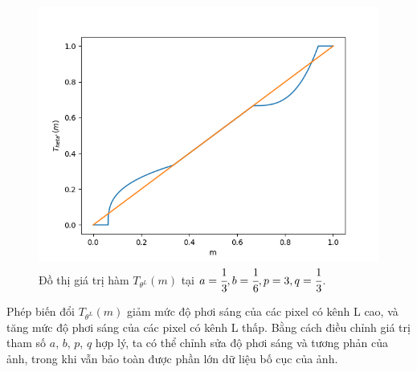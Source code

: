 \documentclass[12pt]{extreport}
\begin{document}
\begin{figure}[H]
    \centering
    \includegraphics[width=.7\linewidth]{figure45.png}
    \caption{Đồ thị giá trị hàm $ T_{\theta^L}(m) $ tại $ a = \cfrac{1}{3}, b = \cfrac{1}{6}, p = 3, q = \cfrac{1}{3} $.}
\end{figure}

Phép biến đổi $ T_{\theta^L}(m) $ giảm mức độ phơi sáng của các pixel có kênh L cao, và tăng mức độ phơi sáng của các pixel có kênh L thấp. Bằng cách điều chỉnh giá trị tham số $ a $, $ b $, $ p $, $ q $ hợp lý, ta có thể chỉnh sửa độ phơi sáng và tương phản của ảnh, trong khi vẫn bảo toàn được phần lớn dữ liệu bố cục của ảnh.
\end{document}
